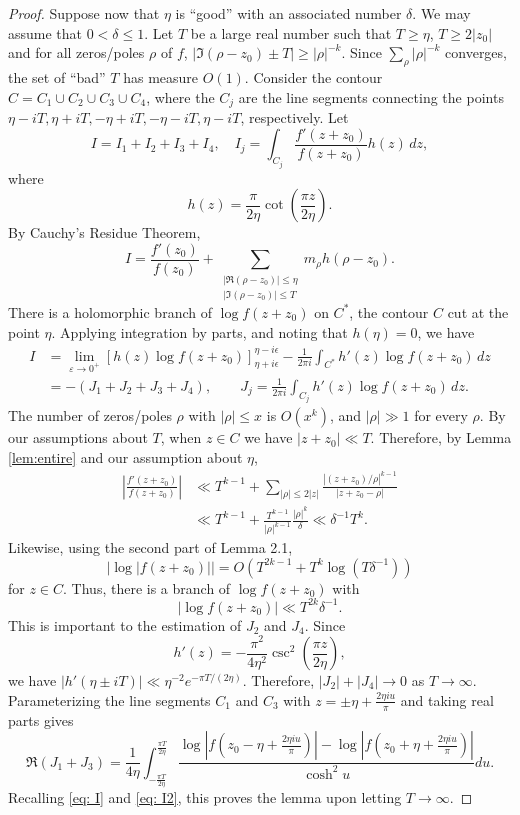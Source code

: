 \documentclass[10pt]{amsart}
\theoremstyle{remark}
\theoremstyle{plain}
\numberwithin{equation}{section}
\theoremstyle{definition}
\def\({\left(}
\def\){\right)}
\begin{document}
\begin{proof}
Suppose now that $\eta$ is ``good'' with an associated number $\delta$.
We may assume that $0<\delta\le 1$.  Let $T$
be a large real number such that $T\ge \eta$, $T\ge 2|z_0|$ and
for all zeros/poles $\rho$ of $f$, $|\Im (\rho-z_0) \pm T|\ge |\rho|^{-k}$. 
Since $\sum_\rho |\rho|^{-k}$ converges,
 the set of ``bad'' $T$ has measure $O(1)$.  Consider the
contour $C=C_1 \cup C_2 \cup C_3 \cup C_4$, where the $C_j$ are the line
segments connecting the points $\eta-iT, \eta+iT, -\eta+iT, -\eta-iT, \eta-iT$,
respectively.  Let
$$
I=I_1+I_2+I_3+I_4, \quad I_j = \int_{C_j} \frac{f'(z+z_0)}{f(z+z_0)}h(z)\, dz,
$$
where
$$
h(z) = \frac{\pi}{2\eta} \cot \( \frac{\pi z}{2\eta} \).
$$
By Cauchy's Residue Theorem,
\begin{equation}
I = \frac{f'(z_0)}{f(z_0)} + \sum_{\substack{|\Re (\rho-z_0) | \le \eta \\
|\Im (\rho-z_0)|\le T}} m_\rho h(\rho-z_0). \label{eq: I}
\end{equation}
There is a holomorphic branch of $\log f(z+z_0)$ on $C^*$, the contour $C$
cut at the point $\eta$.  Applying integration by parts, and noting that
$h(\eta)=0$, we have
\begin{equation}
\begin{split}
I &= \lim_{\varepsilon \to 0^+} \left[ h(z) \log f(z+z_0) \right]
_{\eta+i\epsilon}^{\eta-i\epsilon} - \frac{1}
{2\pi i} \int_{C^*} h'(z) \log f(z+z_0)\, dz \\
&= - (J_1+J_2+J_3+J_4), \qquad J_j = \frac{1}{2\pi i} \int_{C_j}h'(z)
\log f(z+z_0)\, dz.
\end{split}
\label{eq: I2}
\end{equation}
The number of zeros/poles $\rho$ with $|\rho| \le x$ is $O(x^k)$, and 
$|\rho| \gg 1$ for every $\rho$.
By our assumptions about $T$, when $z\in C$ we have $|z+z_0| \ll
T$.  Therefore, by Lemma \ref{lem:entire} and our assumption about $\eta$,
\begin{align*}
\left|\frac{f'(z+z_0)}{f(z+z_0)} \right| &\ll
T^{k-1} +  \sum_{|\rho| \le 2|z|} \frac{|(z+z_0)/\rho|^{k-1}}{|z+z_0-\rho|}\\
&\ll T^{k-1} + \frac{T^{k-1}}{|\rho|^{k-1}} \frac{|\rho|^k}{\delta}
 \ll \delta^{-1}T^{k}.
\end{align*}
Likewise, using the second part of Lemma 2.1, 
$$
|\log |f(z+z_0)|| = O(T^{2k-1}+T^k\log(T \delta^{-1}))
$$
for $z\in C$.  Thus, there is a branch of $\log f(z+z_0)$ with 
$$
|\log f(z+z_0)| \ll T^{2k}\delta^{-1}.
$$
This is important to the estimation of $J_2$ and $J_4$.   Since 
$$
h'(z)=-\frac{\pi^2}{4\eta^2} \csc^2\(\frac{\pi z}{2\eta} \),
$$
we have $|h'(\eta \pm iT)| \ll \eta^{-2} e^{-\pi T/(2\eta)}$.
Therefore, $|J_2|+|J_4| \to 0$ as $T\to \infty$.
  Parameterizing the line segments
$C_1$ and $C_3$ with $z=\pm \eta + \frac{2\eta i u}{\pi}$ and taking real
parts gives 
$$
\Re (J_1+J_3) = \frac{1}{4\eta} \int_{-\frac{\pi T}{2\eta}}^{\frac{\pi T}
  {2\eta}} \frac{\log \left| f \(z_0-\eta+
  \tfrac{2\eta i u}{\pi} \) \right| -
\log \left| f\(z_0+\eta+\tfrac{2\eta iu}{\pi} \) \right|}{\cosh^2 u} du.
$$
Recalling \eqref{eq: I} and \eqref{eq: I2},
 this proves the lemma upon letting $T\to \infty$.
\end{proof}
\end{document}
